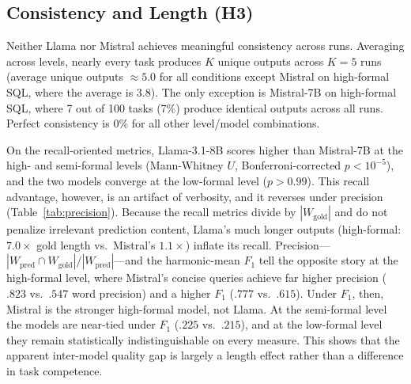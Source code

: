 \documentclass[runningheads]{llncs}
\begin{document}
\subsection{Consistency and Length (H3)}
\label{sec:consistency}

Neither Llama nor Mistral achieves meaningful consistency across runs. Averaging across levels, nearly every task produces $K$ unique outputs across $K\!=\!5$ runs (average unique outputs $\approx 5.0$ for all conditions except Mistral on high-formal SQL, where the average is 3.8). The only exception is Mistral-7B on high-formal SQL, where 7 out of 100 tasks (7\%) produce identical outputs across all runs. Perfect consistency is 0\% for all other level/model combinations.

\label{sec:model-comparison}

On the recall-oriented metrics, Llama-3.1-8B scores higher than Mistral-7B at the high- and semi-formal levels (Mann-Whitney $U$, Bonferroni-corrected $p < 10^{-5}$), and the two models converge at the low-formal level ($p > 0.99$). This recall advantage, however, is an artifact of verbosity, and it reverses under precision (Table~\ref{tab:precision}). Because the recall metrics divide by $|W_{\text{gold}}|$ and do not penalize irrelevant prediction content, Llama's much longer outputs (high-formal: $7.0\times$ gold length vs.\ Mistral's $1.1\times$) inflate its recall. Precision---$|W_{\text{pred}} \cap W_{\text{gold}}| / |W_{\text{pred}}|$---and the harmonic-mean $F_1$ tell the opposite story at the high-formal level, where Mistral's concise queries achieve far higher precision ($.823$ vs.\ $.547$ word precision) and a higher $F_1$ ($.777$ vs.\ $.615$). Under $F_1$, then, Mistral is the stronger high-formal model, not Llama. At the semi-formal level the models are near-tied under $F_1$ ($.225$ vs.\ $.215$), and at the low-formal level they remain statistically indistinguishable on every measure. This shows that the apparent inter-model quality gap is largely a length effect rather than a difference in task competence.
\end{document}
